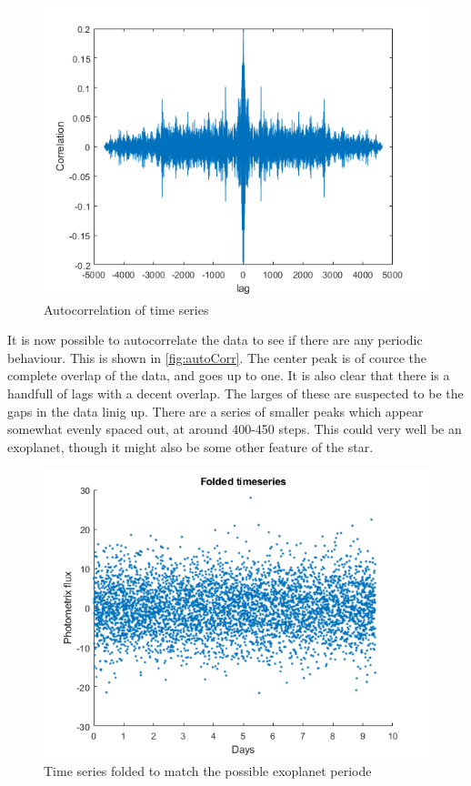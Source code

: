 \begin{figure}[h]
\centering
\includegraphics[widht=\textwidth]{matlabstuff/Kepler_autoCorr.png}
\caption{Autocorrelation of time series}
\label{fig:autoCorr}
\end{figure}

It is now possible to autocorrelate the data to see if there are any periodic behaviour. This is shown in \autoref{fig:autoCorr}. The center peak is of cource the complete overlap of the data, and goes up to one. It is also clear that there is a handfull of lags with a decent overlap. The larges of these are suspected to be the gaps in the data linig up. There are a series of smaller peaks which appear somewhat evenly spaced out, at around 400-450 steps. This could very well be an exoplanet, though it might also be some other feature of the star.\\


\begin{figure}[h]
\centering
\includegraphics[widht=\textwidth]{matlabstuff/fold_data.png}
\caption{Time series folded to match the possible exoplanet periode}
\label{fig:foldData}
\end{figure}

